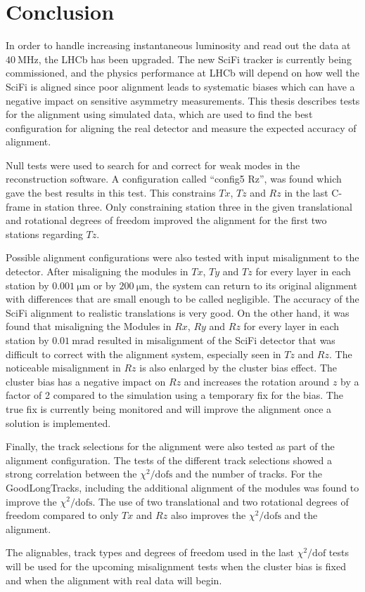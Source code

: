 \chapter{Conclusion}

In order to handle increasing instantaneous luminosity and read out the data at $\SI{40}{\mega\hertz}$, the LHCb has been upgraded. The new SciFi tracker is currently being commissioned, and the physics performance at LHCb will depend on how well the SciFi is aligned since poor alignment leads to systematic biases which can have a negative impact on sensitive asymmetry measurements. This thesis describes tests for the alignment using simulated data, which are used to find the best configuration for aligning the real detector and measure the expected accuracy of alignment.

Null tests were used to search for and correct for weak modes in the reconstruction software. A configuration called ``config5 Rz'', was found which gave the best results in this test. This constrains $Tx$, $Tz$ and $Rz$ in the last C-frame in station three.
Only constraining station three in the given translational and rotational degrees of freedom improved the alignment for the first two stations regarding $Tz$.

Possible alignment configurations were also tested with input misalignment to the detector. After misaligning the modules in $Tx$, $Ty$ and $Tz$ for every layer in each station by $\SI{0.001}{\micro\metre}$ or by $\SI{200}{\micro\metre}$, the system can return to its original alignment with differences that are small enough to be called negligible. The accuracy of the SciFi alignment to realistic translations is very good. On the other hand, it was found that misaligning the Modules in $Rx$, $Ry$ and $Rz$ for every layer in each station by $\SI{0.01}{\milli\radian}$ resulted in misalignment of the SciFi detector that was difficult to correct with the alignment system, especially seen in $Tz$ and $Rz$. The noticeable misalignment in $Rz$ is also enlarged by the cluster bias effect. The cluster bias has a negative impact on $Rz$ and increases the rotation around $z$ by a factor of 2 compared to the simulation using a temporary fix for the bias. The true fix is currently being monitored and will improve the alignment once a solution is implemented.

Finally, the track selections for the alignment were also tested as part of the alignment configuration. The tests of the different track selections showed a strong correlation between the $\chi^2 / \text{dofs}$ and the number of tracks.
For the GoodLongTracks, including the additional alignment of the modules was found to improve the $\chi^2 / \text{dofs}$. The use of two translational and two rotational degrees of freedom compared to only $Tx$ and $Rz$ also improves the $\chi^2 / \text{dofs}$ and the alignment.

The alignables, track types and degrees of freedom used in the last $\chi^2 / \text{dof}$ tests will be used for the upcoming misalignment tests when the cluster bias is fixed and when the alignment with real data will begin.

